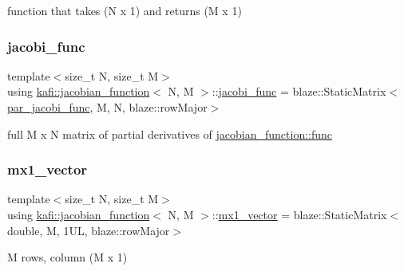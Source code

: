 function that takes {\ttfamily (N x 1)} and returns {\ttfamily (M x 1)} \mbox{\label{classkafi_1_1jacobian__function_ac8f4a65fbe71eb34d1b7914024ad2d85}} 
\subsubsection{\texorpdfstring{jacobi\+\_\+func}{jacobi\_func}}
{\footnotesize\ttfamily template$<$size\+\_\+t N, size\+\_\+t M$>$ \\
using \hyperlink{classkafi_1_1jacobian__function}{kafi\+::jacobian\+\_\+function}$<$ N, M $>$\+::\hyperlink{classkafi_1_1jacobian__function_ac8f4a65fbe71eb34d1b7914024ad2d85}{jacobi\+\_\+func} =  blaze\+::\+Static\+Matrix$<$\hyperlink{classkafi_1_1jacobian__function_a4133d937d8f1d502de7424cb1f4f4e36}{par\+\_\+jacobi\+\_\+func}, M, N, blaze\+::row\+Major$>$}

full {\ttfamily M x N} matrix of partial derivatives of \hyperlink{classkafi_1_1jacobian__function_a91cc300a9dba8c3e6787510d48e6fc37}{jacobian\+\_\+function\+::func} \mbox{\label{classkafi_1_1jacobian__function_ad8e32b40bc05db5ee53705a30257761d}} 
\subsubsection{\texorpdfstring{mx1\+\_\+vector}{mx1\_vector}}
{\footnotesize\ttfamily template$<$size\+\_\+t N, size\+\_\+t M$>$ \\
using \hyperlink{classkafi_1_1jacobian__function}{kafi\+::jacobian\+\_\+function}$<$ N, M $>$\+::\hyperlink{classkafi_1_1jacobian__function_ad8e32b40bc05db5ee53705a30257761d}{mx1\+\_\+vector} =  blaze\+::\+Static\+Matrix$<$double, M, 1\+U\+L, blaze\+::row\+Major$>$}

{\ttfamily M} rows, {} column {\ttfamily (M x 1)} \mbox{\label{classkafi_1_1jacobian__function_a3cfd8181614c2795ae040118ff143a8e}} 
